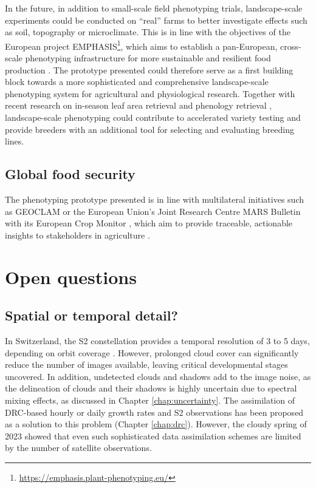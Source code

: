 In the future, in addition to small-scale field phenotyping trials, landscape-scale experiments could be conducted on ``real'' farms to better investigate effects such as soil, topography or microclimate. This is in line with the objectives of the European project EMPHASIS\footnote{\url{https://emphasis.plant-phenotyping.eu/}}, which aims to establish a pan-European, cross-scale phenotyping infrastructure for more sustainable and resilient food production \citep{pieruschka_plant_2019}. The prototype presented could therefore serve as a first building block towards a more sophisticated and comprehensive landscape-scale phenotyping system for agricultural and physiological research. Together with recent research on in-season leaf area retrieval \citep{li_daily_2024} and phenology retrieval \citep{liao_near_2023}, landscape-scale phenotyping could contribute to accelerated variety testing and provide breeders with an additional tool for selecting and evaluating breeding lines.

\subsection{Global food security}

The phenotyping prototype presented is in line with multilateral initiatives such as \gls{GEOCLAM} or the European Union's Joint Research Centre MARS Bulletin with its European Crop Monitor \citep{van_der_velde_use_2019}, which aim to provide traceable, actionable insights to stakeholders in agriculture \citep{whitcraft_no_2019}.



\section{Open questions}
\label{sec:disc-open-questions}
\subsection{Spatial or temporal detail?}
In Switzerland, the \gls{S2} constellation provides a temporal resolution of 3 to 5 days, depending on orbit coverage \citep{pazur_national_2022}. However, prolonged cloud cover can significantly reduce the number of images available, leaving critical developmental stages uncovered. In addition, undetected clouds and shadows add to the image noise, as the delineation of clouds and their shadows is highly uncertain due to spectral mixing effects, as discussed in Chapter \ref{chap:uncertainty}. The assimilation of \gls{DRC}-based hourly or daily growth rates and \gls{S2} observations has been proposed as a solution to this problem (Chapter \ref{chap:drc}). However, the cloudy spring of 2023 showed that even such sophisticated data assimilation schemes are limited by the number of satellite observations.

